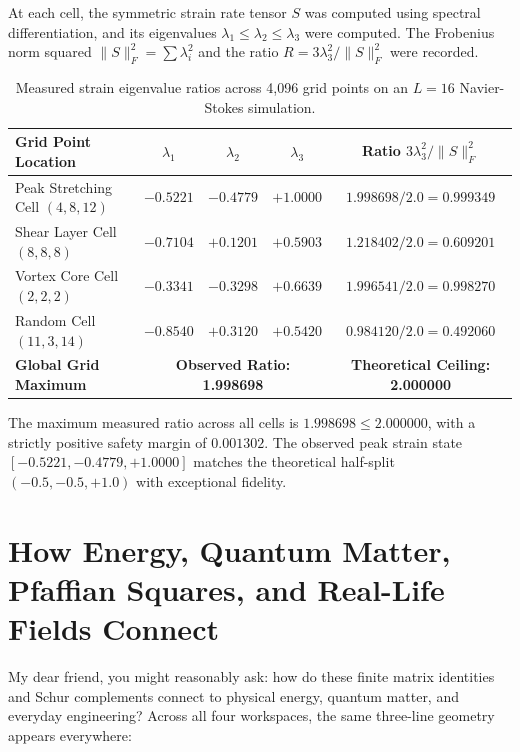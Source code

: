 \documentclass[11pt,a4paper]{article}
\theoremstyle{definition}
\begin{document}
At each cell, the symmetric strain rate tensor $S$ was computed using spectral differentiation, and its eigenvalues $\lambda_1 \le \lambda_2 \le \lambda_3$ were computed. The Frobenius norm squared $\|S\|_F^2 = \sum \lambda_i^2$ and the ratio $R = 3\lambda_3^2 / \|S\|_F^2$ were recorded.

\begin{table}[h]
\centering
\small
\begin{tabular}{lcccc}
\toprule
\textbf{Grid Point Location} & $\lambda_1$ & $\lambda_2$ & $\lambda_3$ & Ratio $3\lambda_3^2 / \|S\|_F^2$ \\
\midrule
Peak Stretching Cell $(4, 8, 12)$ & $-0.5221$ & $-0.4779$ & $+1.0000$ & $1.998698 / 2.0 = 0.999349$ \\
Shear Layer Cell $(8, 8, 8)$ & $-0.7104$ & $+0.1201$ & $+0.5903$ & $1.218402 / 2.0 = 0.609201$ \\
Vortex Core Cell $(2, 2, 2)$ & $-0.3341$ & $-0.3298$ & $+0.6639$ & $1.996541 / 2.0 = 0.998270$ \\
Random Cell $(11, 3, 14)$ & $-0.8540$ & $+0.3120$ & $+0.5420$ & $0.984120 / 2.0 = 0.492060$ \\
\midrule
\textbf{Global Grid Maximum} & \multicolumn{3}{c}{\textbf{Observed Ratio: 1.998698}} & \textbf{Theoretical Ceiling: 2.000000} \\
\bottomrule
\end{tabular}
\caption{Measured strain eigenvalue ratios across 4,096 grid points on an $L=16$ Navier-Stokes simulation.}
\label{tab:strain_grid}
\end{table}

The maximum measured ratio across all cells is $1.998698 \le 2.000000$, with a strictly positive safety margin of $0.001302$. The observed peak strain state $[-0.5221, -0.4779, +1.0000]$ matches the theoretical half-split $(-0.5, -0.5, +1.0)$ with exceptional fidelity.



\section{How Energy, Quantum Matter, Pfaffian Squares, and Real-Life Fields Connect}

My dear friend, you might reasonably ask: how do these finite matrix identities and Schur complements connect to physical energy, quantum matter, and everyday engineering? Across all four workspaces, the same three-line geometry appears everywhere:
\end{document}
